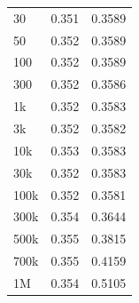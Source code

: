 \documentclass{article}
\begin{document}
\begin{itemize}
\begin{enumerate}[label=\alph*]
\begin{table}[h]
\begin{tabular}{lll}
        30                      & 0.351                                                              & 0.3589                                                           \\
        50                      & 0.352                                                              & 0.3589                                                           \\
        100                     & 0.352                                                              & 0.3589                                                           \\
        300                     & 0.352                                                              & 0.3586                                                           \\
        1k                      & 0.352                                                              & 0.3583                                                           \\
        3k                      & 0.352                                                              & 0.3582                                                           \\
        10k                     & 0.353                                                              & 0.3583                                                           \\
        30k                     & 0.352                                                              & 0.3583                                                           \\
        100k                    & 0.352                                                              & 0.3581                                                           \\
        300k                    & 0.354                                                              & 0.3644                                                           \\
        500k                    & 0.355                                                              & 0.3815                                                           \\
        700k                    & 0.355                                                              & 0.4159                                                           \\
        1M                      & 0.354                                                              & 0.5105                                                          

\end{tabular}
\end{table}
\end{enumerate}
\end{itemize}
\end{document}
